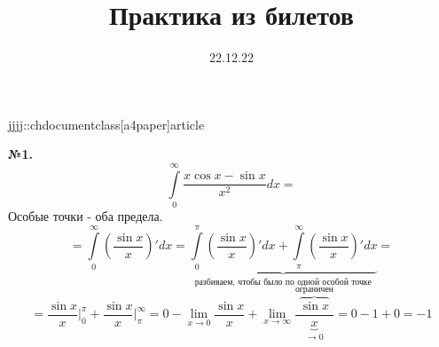 jjjj::chdocumentclass[a4paper]{article}

\usepackage[14pt]{extsizes}                                         %
\usepackage[left=2.5cm,right=2.5cm,top=2.5cm,bottom=3cm]{geometry}  %

\usepackage{float}


\usepackage{cmap}
\usepackage[T2A]{fontenc}
\usepackage[utf8]{inputenc}
\usepackage[russian]{babel}           
\usepackage{amsmath}
\usepackage{amssymb}
\usepackage{amsfonts}

\newtheorem{defin}{Определение}
\newtheorem{example}{Пример}
\newtheorem{zam}{Замечание}
\newtheorem{theor}{Теорема}

\author{}
\title{Практика из билетов}
\date{22.12.22}


\maketitle
\textbf{№1.}
$$\int\limits_{0}^{\infty}\frac{x\cos x-\sin x}{x^2}dx = $$ 
Особые точки - оба предела. 
$$= \int\limits_{0}^{\infty}\left( \frac{\sin x}{x} \right)'dx = 
\underbrace{
\int\limits_{0}^{\pi} \left( \frac{\sin x}{x} \right)'dx + 
\int\limits_{\pi}^{\infty} \left( \frac{\sin x}{x} \right)'dx}_\text{разбиваем,
чтобы было по одной особой точке} = 
$$
$$= \frac{\sin x}{x}\bigg|^\pi_0+\frac{\sin x}{x}\bigg|^\infty_\pi = 
0 - \lim\limits_{x \to 0}\frac{\sin x}{x}+\lim\limits_{x \to \infty} 
\frac{ \overbrace{\sin x}^\text{ограничен} }{\underbrace{x}_{\to 0}}
= 0-1+0 = -1 $$

